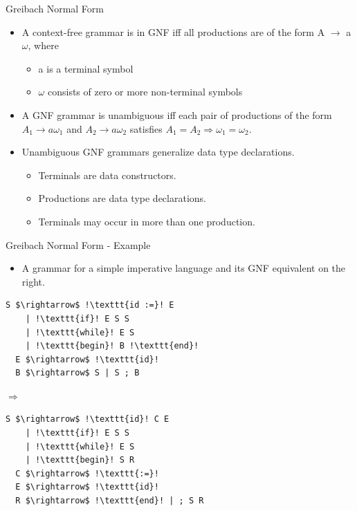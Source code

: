 \documentclass[10pt]{beamer}
\begin{document}
\begin{frame}[fragile]{Greibach Normal Form}

\begin{itemize}

\item A context-free grammar is in GNF iff all productions are of the form A $\rightarrow$ a$\omega$, where
\begin{itemize}
\item a is a terminal symbol
\item $\omega$ consists of zero or more non-terminal symbols
\end{itemize}
\item A GNF grammar is unambiguous iff each pair of productions of the form $A_1 \rightarrow a\omega_1$ and $A_2 \rightarrow a\omega_2$ satisfies $A_1 = A_2 \Rightarrow \omega_1 = \omega_2$.
\item Unambiguous GNF grammars generalize data type declarations.
\begin{itemize}
\item Terminals are data constructors.
\item Productions are data type declarations.
\item Terminals may occur in more than one production.
\end{itemize}

\end{itemize}

\end{frame}

\begin{frame}[fragile]{Greibach Normal Form - Example}

\begin{itemize}
\item A grammar for a simple imperative language and its GNF equivalent on the right.
\end{itemize}

\begin{minipage}[t]{0.45\textwidth}
\begin{lstlisting}[mathescape=true, escapechar=!]
  S $\rightarrow$ !\texttt{id :=}! E
    | !\texttt{if}! E S S
    | !\texttt{while}! E S
    | !\texttt{begin}! B !\texttt{end}!
  E $\rightarrow$ !\texttt{id}!
  B $\rightarrow$ S | S ; B
\end{lstlisting}
\end{minipage}
\hfill
\begin{minipage}[t]{0.05\textwidth}
  $\Rightarrow$ 
\end{minipage}
\hfill
\begin{minipage}[t]{0.45\textwidth}
\begin{lstlisting}[mathescape=true, escapechar=!]
  S $\rightarrow$ !\texttt{id}! C E
    | !\texttt{if}! E S S
    | !\texttt{while}! E S
    | !\texttt{begin}! S R
  C $\rightarrow$ !\texttt{:=}!
  E $\rightarrow$ !\texttt{id}!
  R $\rightarrow$ !\texttt{end}! | ; S R
\end{lstlisting}
\end{minipage}

\end{frame}
\end{document}
